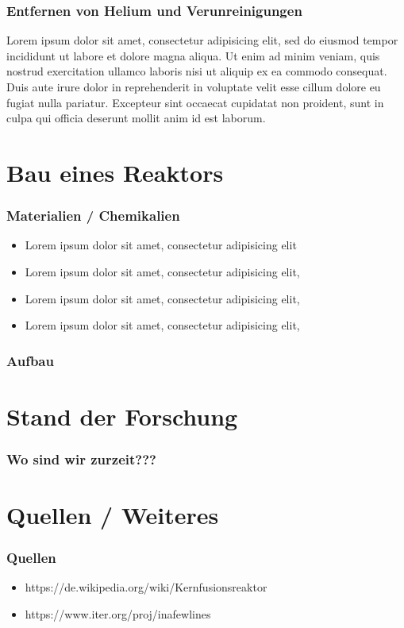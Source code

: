\documentclass[aspectratio=169]{beamer}
\begin{document}
      \begin{frame}
        \frametitle{Entfernen von Helium und Verunreinigungen}
        Lorem ipsum dolor sit amet, consectetur adipisicing elit, sed do eiusmod tempor incididunt ut labore et dolore magna aliqua. Ut enim ad minim veniam, quis nostrud exercitation ullamco laboris nisi ut aliquip ex ea commodo consequat. Duis aute irure dolor in reprehenderit in voluptate velit esse cillum dolore eu fugiat nulla pariatur. Excepteur sint occaecat cupidatat non proident, sunt in culpa qui officia deserunt mollit anim id est laborum.
      \end{frame}

  \section{Bau eines Reaktors}

    \begin{frame}
      \frametitle{Materialien / Chemikalien}
      \begin{itemize}
        \item Lorem ipsum dolor sit amet, consectetur adipisicing elit
        \item Lorem ipsum dolor sit amet, consectetur adipisicing elit,
        \item Lorem ipsum dolor sit amet, consectetur adipisicing elit,
        \item Lorem ipsum dolor sit amet, consectetur adipisicing elit,
      \end{itemize}
    \end{frame}

    \begin{frame}
      \frametitle{Aufbau}
    \end{frame}

  \section{Stand der Forschung}

    \begin{frame}
      \frametitle{Wo sind wir zurzeit???}
    \end{frame}

  \section{Quellen / Weiteres}

    \begin{frame}
      \frametitle{Quellen}
      \begin{itemize}
        \item https://de.wikipedia.org/wiki/Kernfusionsreaktor
        \item https://www.iter.org/proj/inafewlines
      \end{itemize}
    \end{frame}
\end{document}
